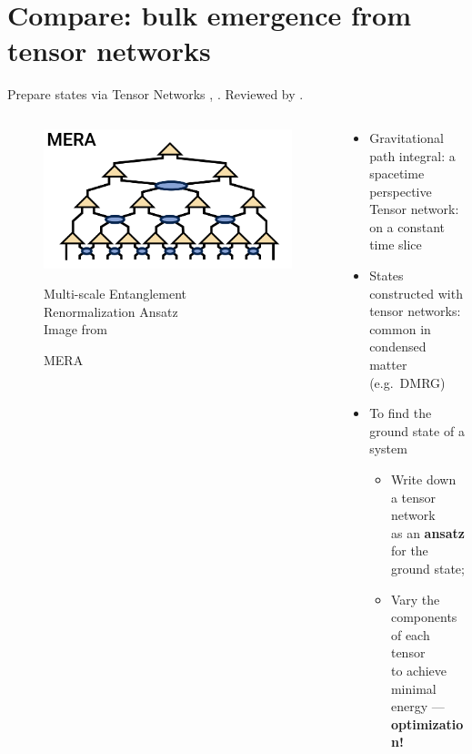 \documentclass[aspectratio=169,10pt
	,noamsthm
]{beamer}
\begin{document}
\section{Compare: bulk emergence from tensor networks}


\begin{frame}{Prepare states via Tensor Networks}{%
	\textcite{Vidal:2007hda}, \textcite{Swingle:2009bg}. Reviewed by \textcite{Rangamani:2016dms}.
}
	\begin{columns}
	\begin{column}{.4\textwidth}
		\begin{figure}[!h]
		\centering
		\includegraphics[width=\textwidth]{img/MERA.png}
		\caption{MERA}
		
		\small
		Multi-scale Entanglement\\
		Renormalization Ansatz
		\\[2ex]
		\footnotesize
		Image from 
		\end{figure}
	\end{column}
	\begin{column}{.6\textwidth}
		\begin{itemize}
		\item Gravitational path integral: a spacetime perspective\\
		Tensor network: on a constant time slice
	\pause
		\item States constructed with tensor networks:\\
		common in condensed matter (e.g.~DMRG)\\
		\item To find the ground state of a system
			\begin{itemize}
			\item Write down a tensor network \\
			as an \textbf{ansatz} for the ground state;\\
			\item Vary the components of each tensor \\
			to achieve minimal energy --- \textbf{optimization!}
			\end{itemize}
		\end{itemize}
	\end{column}
	\end{columns}
\end{frame}
\end{document}
